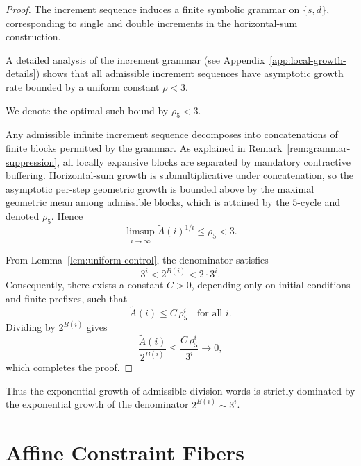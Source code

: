 \documentclass[12pt, oneside]{article}
\numberwithin{equation}{section}
\theoremstyle{definition}
\theoremstyle{plain}
\theoremstyle{remark}
\begin{document}
\begin{proof}
The increment sequence  induces a finite symbolic grammar on $\{s,d\}$,
corresponding to single and double increments in the horizontal-sum construction.


A detailed analysis of the increment grammar (see Appendix~\ref{app:local-growth-details})
shows that all admissible increment sequences have asymptotic growth rate bounded by a
uniform constant $\rho < 3$.

We denote the optimal such bound by $\rho_5 < 3$.

Any admissible infinite increment sequence decomposes into concatenations of finite
blocks permitted by the grammar. As explained in Remark~\ref{rem:grammar-suppression},
all locally expansive blocks are separated by mandatory contractive buffering. Horizontal-sum
growth is submultiplicative under concatenation, so the asymptotic per-step geometric
growth is bounded above by the maximal geometric mean among admissible blocks, which is
attained by the $5$-cycle and denoted $\rho_5$. Hence
\[
\limsup_{i\to\infty} \widetilde A(i)^{1/i} \le \rho_5 < 3.
\]

From Lemma~\ref{lem:uniform-control}, the denominator satisfies
\[
3^i < 2^{B(i)} < 2\cdot 3^i.
\]
Consequently, there exists a constant $C>0$, depending only on initial conditions
and finite prefixes, such that
\[
\widetilde A(i) \le C\,\rho_5^i \quad \text{for all } i.
\]
Dividing by $2^{B(i)}$ gives
\[
\frac{\widetilde A(i)}{2^{B(i)}} \le \frac{C\,\rho_5^i}{3^i} \longrightarrow 0,
\]
which completes the proof.
\end{proof}

Thus the exponential growth of admissible division words is strictly dominated
by the exponential growth of the denominator $2^{B(i)} \sim 3^i$.

\section{Affine Constraint Fibers}
\end{document}
